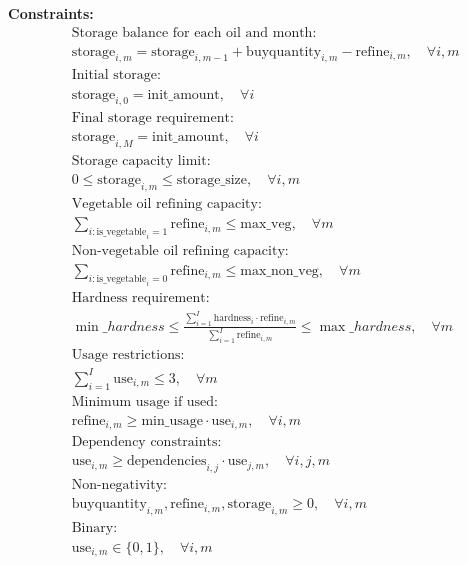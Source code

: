 \documentclass{article}
\begin{document}
\textbf{Constraints:}
\begin{align*}
& \text{Storage balance for each oil and month:} \\
& \text{storage}_{i,m} = \text{storage}_{i,m-1} + \text{buyquantity}_{i,m} - \text{refine}_{i,m}, \quad \forall i, m \\
& \text{Initial storage:} \\
& \text{storage}_{i,0} = \text{init\_amount}, \quad \forall i \\
& \text{Final storage requirement:} \\
& \text{storage}_{i,M} = \text{init\_amount}, \quad \forall i \\
& \text{Storage capacity limit:} \\
& 0 \leq \text{storage}_{i,m} \leq \text{storage\_size}, \quad \forall i, m \\
& \text{Vegetable oil refining capacity:} \\
& \sum_{i: \text{is\_vegetable}_i = 1} \text{refine}_{i,m} \leq \text{max\_veg}, \quad \forall m \\
& \text{Non-vegetable oil refining capacity:} \\
& \sum_{i: \text{is\_vegetable}_i = 0} \text{refine}_{i,m} \leq \text{max\_non\_veg}, \quad \forall m \\
& \text{Hardness requirement:} \\
& \min\_hardness \leq \frac{\sum_{i=1}^{I} \text{hardness}_i \cdot \text{refine}_{i,m}}{\sum_{i=1}^{I} \text{refine}_{i,m}} \leq \max\_hardness, \quad \forall m \\
& \text{Usage restrictions:} \\
& \sum_{i=1}^{I} \text{use}_{i,m} \leq 3, \quad \forall m \\
& \text{Minimum usage if used:} \\
& \text{refine}_{i,m} \geq \text{min\_usage} \cdot \text{use}_{i,m}, \quad \forall i, m \\
& \text{Dependency constraints:} \\
& \text{use}_{i,m} \geq \text{dependencies}_{i,j} \cdot \text{use}_{j,m}, \quad \forall i, j, m \\
& \text{Non-negativity:} \\
& \text{buyquantity}_{i,m}, \text{refine}_{i,m}, \text{storage}_{i,m} \geq 0, \quad \forall i, m \\
& \text{Binary:} \\
& \text{use}_{i,m} \in \{0,1\}, \quad \forall i, m 
\end{align*}
\end{document}

